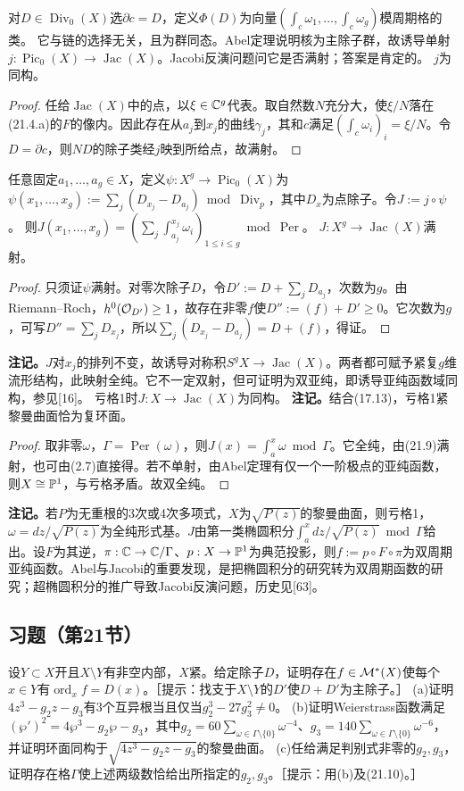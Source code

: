 对$D\in\operatorname{Div}_0(X)$选$\partial c=D$，定义$\Phi(D)$为向量$(\int_c\omega_1,\ldots,\int_c\omega_g)$模周期格的类。
它与链的选择无关，且为群同态。Abel定理说明核为主除子群，故诱导单射$j:\operatorname{Pic}_0(X)\to\operatorname{Jac}(X)$。Jacobi反演问题问它是否满射；答案是肯定的。
$j$为同构。
\begin{proof}
任给$\operatorname{Jac}(X)$中的点，以$\xi\in\mathbb C^g$代表。取自然数$N$充分大，使$\xi/N$落在(21.4.a)的$F$的像内。因此存在从$a_j$到$x_j$的曲线$\gamma_j$，其和$c$满足$(\int_c\omega_i)_i=\xi/N$。令$D=\partial c$，则$ND$的除子类经$j$映到所给点，故满射。
\end{proof}
任意固定$a_1,\ldots,a_g\in X$，定义$\psi:X^g\to\operatorname{Pic}_0(X)$为$\psi(x_1,\ldots,x_g):=\sum_j(D_{x_j}-D_{a_j})\bmod\operatorname{Div}_p$，其中$D_x$为点除子。令$J:=j\circ\psi$。
则$J(x_1,\ldots,x_g)=(\sum_j\int_{a_j}^{x_j}\omega_i)_{1\le i\le g}\bmod\operatorname{Per}$。
$J:X^g\to\operatorname{Jac}(X)$满射。
\begin{proof}
只须证$\psi$满射。对零次除子$D$，令$D':=D+\sum_jD_{a_j}$，次数为$g$。由Riemann--Roch，$h^0(\mathcal O_{D'})\ge1$，故存在非零$f$使$D'':=(f)+D'\ge0$。它次数为$g$，可写$D''=\sum_jD_{x_j}$，所以$\sum_j(D_{x_j}-D_{a_j})=D+(f)$，得证。
\end{proof}
\textbf{注记。}$J$对$x_j$的排列不变，故诱导对称积$S^gX\to\operatorname{Jac}(X)$。两者都可赋予紧复$g$维流形结构，此映射全纯。它不一定双射，但可证明为双亚纯，即诱导亚纯函数域同构，参见[16]。
亏格1时$J:X\to\operatorname{Jac}(X)$为同构。
\textbf{注记。}结合(17.13)，亏格1紧黎曼曲面恰为复环面。
\begin{proof}
取非零$\omega$，$\Gamma=\operatorname{Per}(\omega)$，则$J(x)=\int_a^x\omega\bmod\Gamma$。它全纯，由(21.9)满射，也可由(2.7)直接得。若不单射，由Abel定理有仅一个一阶极点的亚纯函数，则$X\cong\mathbb P^1$，与亏格矛盾。故双全纯。
\end{proof}
\textbf{注记。}若$P$为无重根的3次或4次多项式，$X$为$\sqrt{P(z)}$的黎曼曲面，则亏格1，$\omega=dz/\sqrt{P(z)}$为全纯形式基。$J$由第一类椭圆积分$\int_a^x dz/\sqrt{P(z)}\bmod\Gamma$给出。设$F$为其逆，$\pi:\mathbb C\to\mathbb C/\Gamma$、$p:X\to\mathbb P^1$为典范投影，则$f:=p\circ F\circ\pi$为双周期亚纯函数。Abel与Jacobi的重要发现，是把椭圆积分的研究转为双周期函数的研究；超椭圆积分的推广导致Jacobi反演问题，历史见[63]。
\subsection*{习题（第21节）}
设$Y\subset X$开且$X\setminus Y$有非空内部，$X$紧。给定除子$D$，证明存在$f\in\mathcal M^*(X)$使每个$x\in Y$有$\operatorname{ord}_xf=D(x)$。［提示：找支于$X\setminus Y$的$D'$使$D+D'$为主除子。］
(a)证明$4z^3-g_2z-g_3$有3个互异根当且仅当$g_2^3-27g_3^2\ne0$。
(b)证明Weierstrass函数满足$(\wp')^2=4\wp^3-g_2\wp-g_3$，其中$g_2=60\sum_{\omega\in\Gamma\setminus\{0\}}\omega^{-4}$、$g_3=140\sum_{\omega\in\Gamma\setminus\{0\}}\omega^{-6}$，并证明环面同构于$\sqrt{4z^3-g_2z-g_3}$的黎曼曲面。
(c)任给满足判别式非零的$g_2,g_3$，证明存在格$\Gamma$使上述两级数恰给出所指定的$g_2,g_3$。［提示：用(b)及(21.10)。］
